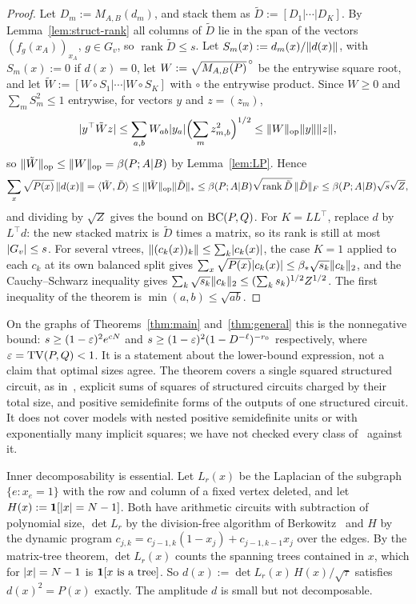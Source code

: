 \begin{proof}
Let $D_m:=M_{A,B}(d_m)$, and stack them as $\tilde D:=[D_1|\cdots|D_K]$. By Lemma~\ref{lem:struct-rank} all columns of $\tilde D$ lie in the span of the vectors $(f_g(x_A))_{x_A}$, $g\in G_v$, so $\operatorname{rank}\tilde D\le s$. Let $S_m(x):=d_m(x)/\lVert d(x)\rVert$, with $S_m(x):=0$ if $d(x)=0$, let $W:=\sqrt{M_{A,B}(P)}^{\,\circ}$ be the entrywise square root, and let $\tilde W:=[W\circ S_1|\cdots|W\circ S_K]$ with $\circ$ the entrywise product. Since $W\ge0$ and $\sum_mS_m^2\le1$ entrywise, for vectors $y$ and $z=(z_m)$,
\[
  \lvert y^{\top}\tilde Wz\rvert\le\sum_{a,b}W_{ab}\lvert y_a\rvert\Bigl(\sum_mz_{m,b}^2\Bigr)^{1/2}\le\lVert W\rVert_{\mathrm{op}}\lVert y\rVert\lVert z\rVert,
\]
so $\lVert \tilde W\rVert_{\mathrm{op}}\le\lVert W\rVert_{\mathrm{op}}=\beta(P;A|B)$ by Lemma~\ref{lem:LP}. Hence
\[
  \sum_x\sqrt{P(x)}\,\lVert d(x)\rVert=\langle\tilde W,\tilde D\rangle\le\lVert \tilde W\rVert_{\mathrm{op}}\lVert \tilde D\rVert_*\le\beta(P;A|B)\sqrt{\operatorname{rank}\tilde D}\,\lVert \tilde D\rVert_F\le\beta(P;A|B)\sqrt s\sqrt Z,
\]
and dividing by $\sqrt Z$ gives the bound on $\mathrm{BC}(P,Q)$. For $K=LL^{\top}$, replace $d$ by $L^{\top}d$: the new stacked matrix is $\tilde D$ times a matrix, so its rank is still at most $\lvert G_v\rvert\le s$. For several vtrees, $\lVert (c_k(x))_k\rVert\le\sum_k\lvert c_k(x)\rvert$, the case $K=1$ applied to each $c_k$ at its own balanced split gives $\sum_x\sqrt{P(x)}\lvert c_k(x)\rvert\le\beta_*\sqrt{s_k}\lVert c_k\rVert_2$, and the Cauchy--Schwarz inequality gives $\sum_k\sqrt{s_k}\lVert c_k\rVert_2\le(\sum_ks_k)^{1/2}Z^{1/2}$. The first inequality of the theorem is $\min(a,b)\le\sqrt{ab}$.
\end{proof}

On the graphs of Theorems~\ref{thm:main} and~\ref{thm:general} this is the nonnegative bound: $s\ge(1-\varepsilon)^2e^{cN}$ and $s\ge(1-\varepsilon)^2(1-D^{-\ell})^{-r_0}$ respectively, where $\varepsilon=\mathrm{TV}(P,Q)<1$. It is a statement about the lower-bound expression, not a claim that optimal sizes agree. The theorem covers a single squared structured circuit, as in~\cite{LoconteEtAl24}, explicit sums of squares of structured circuits charged by their total size, and positive semidefinite forms of the outputs of one structured circuit. It does not cover models with nested positive semidefinite units or with exponentially many implicit squares; we have not checked every class of~\cite{LoconteMengelVergari25} against it.

Inner decomposability is essential. Let $L_r(x)$ be the Laplacian of the subgraph $\{e:x_e=1\}$ with the row and column of a fixed vertex deleted, and let $H(x):=\mathbf{1}[\lvert x\rvert=N-1]$. Both have arithmetic circuits with subtraction of polynomial size, $\det L_r$ by the division-free algorithm of Berkowitz~\cite{Berkowitz84} and $H$ by the dynamic program $c_{j,k}=c_{j-1,k}(1-x_j)+c_{j-1,k-1}x_j$ over the edges. By the matrix-tree theorem, $\det L_r(x)$ counts the spanning trees contained in $x$, which for $\lvert x\rvert=N-1$ is $\mathbf{1}[x\text{ is a tree}]$. So $d(x):=\det L_r(x)\,H(x)/\sqrt\tau$ satisfies $d(x)^2=P(x)$ exactly. The amplitude $d$ is small but not decomposable.

